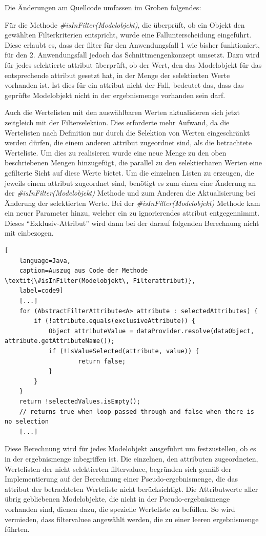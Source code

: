 Die Änderungen am Quellcode umfassen im Groben folgendes:

Für die Methode \textit{\#isInFilter(Modelobjekt)}, die überprüft, ob ein Objekt den gewählten Filterkriterien entspricht, wurde eine Fallunterscheidung eingeführt. Diese erlaubt es, dass der \gls{filter} für den Anwendungsfall 1 wie bisher funktioniert, für den 2. Anwendungsfall jedoch das Schnittmengenkonzept umsetzt. Dazu wird für jedes selektierte \gls{attribut} überprüft, ob der Wert, den das Modelobjekt für das entsprechende \gls{attribut} gesetzt hat, in der Menge der selektierten Werte vorhanden ist. Ist dies für ein \gls{attribut} nicht der Fall, bedeutet das, dass das geprüfte Modelobjekt nicht in der \gls{ergebnismenge} vorhanden sein darf.

Auch die Wertelisten mit den auswählbaren Werten aktualisieren sich jetzt zeitgleich mit der Filterselektion. Dies erforderte mehr Aufwand, da die Wertelisten nach Definition nur durch die Selektion von Werten eingeschränkt werden dürfen, die einem anderen \gls{attribut} zugeordnet sind, als die betrachtete Werteliste. Um dies zu realisieren wurde eine neue Menge zu den oben beschriebenen Mengen hinzugefügt, die parallel zu den selektierbaren Werten eine gefilterte Sicht auf diese Werte bietet. Um die einzelnen Listen zu erzeugen, die jeweils einem \gls{attribut} zugeordnet sind, benötigt es zum einen eine Änderung an der \textit{\#isInFilter(Modelobjekt)} Methode und zum Anderen die Aktualisierung bei Änderung der selektierten Werte. Bei der \textit{\#isInFilter(Modelobjekt)} Methode kam ein neuer Parameter hinzu, welcher ein zu ignorierendes \gls{attribut} entgegennimmt. Dieses \enquote{Exklusiv-Attribut} wird dann bei der darauf folgenden Berechnung nicht mit einbezogen.

\begin{lstlisting}[
    language=Java,
    caption=Auszug aus Code der Methode \textit{\#isInFilter(Modelobjekt\, Filterattribut)},
    label=code9]
	[...]
	for (AbstractFilterAttribute<A> attribute : selectedAttributes) {
		if (!attribute.equals(exclusiveAttribute)) {
			Object attributeValue = dataProvider.resolve(dataObject, attribute.getAttributeName());
			if (!isValueSelected(attribute, value)) {
					return false;
			}
    	}
	}
	return !selectedValues.isEmpty();
	// returns true when loop passed through and false when there is no selection
	[...]
\end{lstlisting}

Diese Berechnung wird für jedes Modelobjekt ausgeführt um festzustellen, ob es in der \gls{ergebnismenge} inbegriffen ist. Die einzelnen, den \gls{attribut}en zugeordneten, Wertelisten der nicht-selektierten \gls{filtervalue}e, begründen sich gemäß der Implementierung auf der Berechnung einer Pseudo-\gls{ergebnismenge}, die das \gls{attribut} der betrachteten Werteliste nicht berücksichtigt. Die Attributwerte aller übrig gebliebenen Modelobjekte, die nicht in der Pseudo-\gls{ergebnismenge} vorhanden sind, dienen dazu, die spezielle Werteliste zu befüllen. So wird vermieden, dass \gls{filtervalue}e angewählt werden, die zu einer leeren \gls{ergebnismenge} führten.

